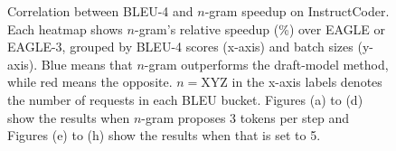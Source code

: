 \begin{figure}[h!]
\begin{center}
\caption{Correlation between BLEU-4 and $n$-gram speedup on InstructCoder. Each heatmap shows $n$-gram’s relative speedup (\%) over EAGLE or EAGLE-3, grouped by BLEU-4 scores (x-axis) and batch sizes (y-axis). Blue means that $n$-gram outperforms the draft-model method, while red means the opposite. $n{=}$XYZ in the x-axis labels denotes the number of requests in each BLEU bucket. Figures (a) to (d) show the results when $n$-gram proposes 3 tokens per step and Figures (e) to (h) show the results when that is set to 5.}
\label{fig:ngram_bleu_heatmap}
\vspace{-0.2in}
\end{center}
\end{figure}

